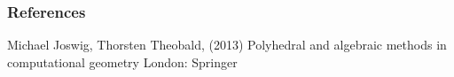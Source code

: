 \documentclass[9pt]{beamer}
\theoremstyle{definition}
\begin{document}

\begin{frame}
  \frametitle{References}
  \footnotesize{
    \begin{thebibliography}{99} %
     Michael Joswig, Thorsten Theobald, (2013)
      \newblock Polyhedral and algebraic methods in computational geometry
      \newblock London: Springer

    \end{thebibliography}
  }
\end{frame}

\end{document}
